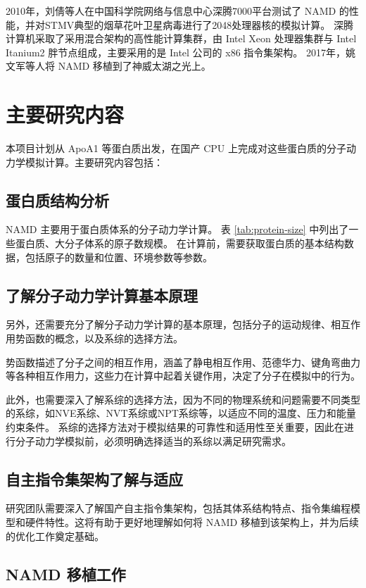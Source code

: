 2010年，刘倩等人在中国科学院网络与信息中心深腾7000平台测试了 NAMD 的性能，并对STMV典型的烟草花叶卫星病毒进行了2048处理器核的模拟计算\cite{刘倩2010基于深腾}。
深腾计算机采取了采用混合架构的高性能计算集群，由 Intel Xeon 处理器集群与 Intel Itanium2 胖节点组成，主要采用的是 Intel 公司的 x86 指令集架构。
2017年，姚文军\cite{姚文军2017基于神威太湖之光的}等人将 NAMD 移植到了神威太湖之光上。

\section{主要研究内容}

本项目计划从 ApoA1 等蛋白质出发，在国产 CPU 上完成对这些蛋白质的分子动力学模拟计算。主要研究内容包括：

\subsection{蛋白质结构分析}

NAMD 主要用于蛋白质体系的分子动力学计算。
表 \ref{tab:protein-size} 中列出了一些蛋白质、大分子体系的原子数规模。
在计算前，需要获取蛋白质的基本结构数据，包括原子的数量和位置、环境参数等参数。

\subsection{了解分子动力学计算基本原理}

另外，还需要充分了解分子动力学计算的基本原理，包括分子的运动规律、相互作用势函数的概念，以及系综的选择方法。

势函数描述了分子之间的相互作用，涵盖了静电相互作用、范德华力、键角弯曲力等各种相互作用力，这些力在计算中起着关键作用，决定了分子在模拟中的行为。

此外，也需要深入了解系综的选择方法，因为不同的物理系统和问题需要不同类型的系综，如NVE系综、NVT系综或NPT系综等，以适应不同的温度、压力和能量约束条件。
系综的选择方法对于模拟结果的可靠性和适用性至关重要，因此在进行分子动力学模拟前，必须明确选择适当的系综以满足研究需求。

\subsection{自主指令集架构了解与适应}

研究团队需要深入了解国产自主指令集架构，包括其体系结构特点、指令集编程模型和硬件特性。这将有助于更好地理解如何将 NAMD 移植到该架构上，并为后续的优化工作奠定基础。

\subsection{NAMD 移植工作}

